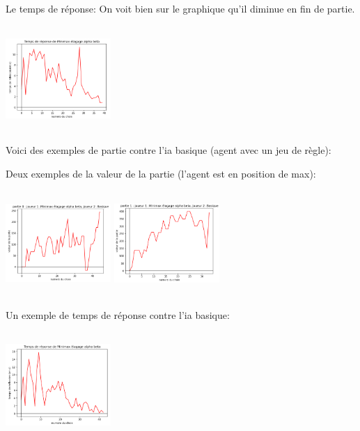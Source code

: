 			    Le temps de réponse: On voit bien sur le graphique qu'il diminue en fin de partie.
                
                \includegraphics[width=4cm,height=4cm]{graphiques/temps_alphbet_alea1}
                
                Voici des exemples de partie contre l'ia basique (agent avec un jeu de règle):
			    
			    Deux exemples de la valeur de la partie (l'agent est en position de max):
			    
			    \includegraphics[width=4cm,height=4cm]{graphiques/valeur_alphbet_basique1}
			    \includegraphics[width=4cm,height=4cm]{graphiques/valeur_alphbet_basique2}
			    
			    Un exemple de temps de réponse contre l'ia basique:
                
                \includegraphics[width=4cm,height=4cm]{graphiques/temps_alphbet_basique1}

